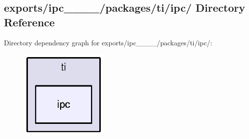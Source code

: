 \subsection{exports/ipc\-\_\-\_\-\_\-\_/packages/ti/ipc/ Directory Reference}
\label{dir_483c661eba1a09e3ba6089a7e4388180}
Directory dependency graph for exports/ipc\-\_\-\_\-\_\-\_/packages/ti/ipc/\-:
\nopagebreak
\begin{figure}[H]
\begin{center}
\leavevmode
\includegraphics[width=123pt]{dir_483c661eba1a09e3ba6089a7e4388180_dep}
\end{center}
\end{figure}
